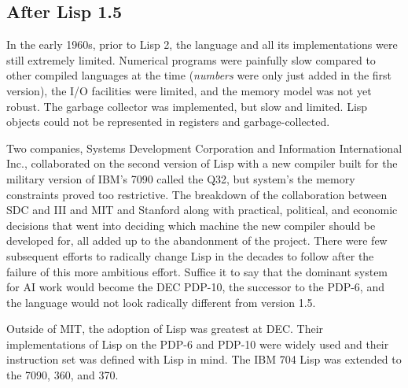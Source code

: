 \subsection{After Lisp 1.5}

In the early 1960s, prior to Lisp 2, the language and all its implementations were still
extremely limited.
Numerical programs were painfully slow compared to other compiled languages at
the time (\textit{numbers} were only just added in the first version), the I/O
facilities were limited, and the memory model was not yet robust.
The garbage collector was implemented, but slow and limited.
Lisp objects could not be represented in registers and garbage-collected.

Two companies, Systems Development Corporation and Information International Inc.,
collaborated on the second version of Lisp with a new compiler
built for the military version of IBM's 7090 called the Q32, but system's the memory constraints
proved too restrictive.
The breakdown of the collaboration between SDC and III and MIT and Stanford along
with practical, political, and economic decisions that went into deciding which machine
the new compiler should be developed for, all added up to the abandonment of the project.
There were few subsequent efforts to radically change Lisp in the decades to follow
after the failure of this more ambitious effort.
Suffice it to say that the dominant system for AI work would become the DEC PDP-10, the
successor to the PDP-6, and the language would not look radically different from
version 1.5.

Outside of MIT, the adoption of Lisp was greatest at DEC.
Their implementations of Lisp on the PDP-6 and PDP-10 were widely used and their
instruction set was defined with Lisp in mind\cite{mccarthy_history_of_lisp_1978}.
The IBM 704 Lisp was extended to the 7090, 360, and 370.
